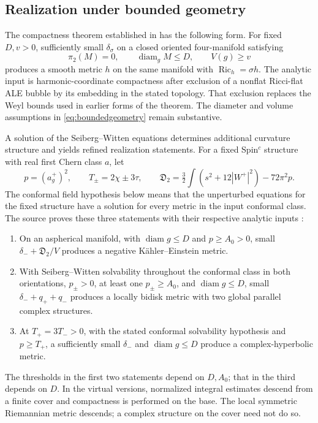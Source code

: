 \documentclass[11pt,a4paper]{article}
\theoremstyle{definition}\newtheorem{definition}[theorem]{Definition}
\theoremstyle{remark}\newtheorem{remark}[theorem]{Remark}
\DeclareMathOperator{\Ric}{Ric}
\DeclareMathOperator{\diam}{diam}
\begin{document}
\subsection{Realization under bounded geometry}
The compactness theorem established in \cite{source-integrated} has the following form. For fixed $D,v>0$, sufficiently small $\delta_\sigma$ on a closed oriented four-manifold satisfying
\begin{equation}\label{eq:boundedgeometry}
 \pi_2(M)=0,\qquad \diam_gM\le D,\qquad V(g)\ge v
\end{equation}
produces a smooth metric $h$ on the same manifold with $\Ric_h=\sigma h$. The analytic input is harmonic-coordinate compactness after exclusion of a nonflat Ricci-flat ALE bubble by its embedding in the stated topology. That exclusion replaces the Weyl bounds used in earlier forms of the theorem. The diameter and volume assumptions in \eqref{eq:boundedgeometry} remain substantive.

A solution of the Seiberg--Witten equations determines additional curvature structure and yields refined realization statements. For a fixed Spin$^c$ structure with real first Chern class $a$, let
\[
 p=(a_g^+)^2,\qquad T_\pm=2\chi\pm3\tau,
 \qquad\mathfrak D_2=\tfrac32\int(s^2+12|W^+|^2)-72\pi^2p.
\]
The conformal field hypothesis below means that the unperturbed equations for the fixed structure have a solution for every metric in the input conformal class. The source proves these three statements with their respective analytic inputs \cite{source-integrated}:
\begin{enumerate}
\item On an aspherical manifold, with $\diam g\le D$ and $p\ge A_0>0$, small $\delta_-+\mathfrak D_2/V$ produces a negative K\"ahler--Einstein metric.
\item With Seiberg--Witten solvability throughout the conformal class in both orientations, $p_\pm>0$, at least one $p_\pm\ge A_0$, and $\diam g\le D$, small $\delta_-+q_++q_-$ produces a locally bidisk metric with two global parallel complex structures.
\item At $T_+=3T_->0$, with the stated conformal solvability hypothesis and $p\ge T_+$, a sufficiently small $\delta_-$ and $\diam g\le D$ produce a complex-hyperbolic metric.
\end{enumerate}
The thresholds in the first two statements depend on $D,A_0$; that in the third depends on $D$. In the virtual versions, normalized integral estimates descend from a finite cover and compactness is performed on the base. The local symmetric Riemannian metric descends; a complex structure on the cover need not do so.
\end{document}

